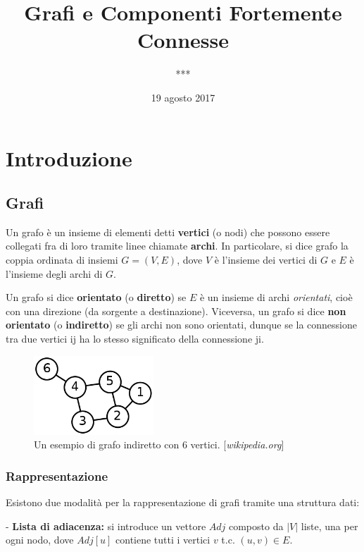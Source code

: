 \documentclass[a4paper,12pt]{article}
\title{Grafi e Componenti Fortemente Connesse}
\author{***}
\date{19 agosto 2017}
\begin{document}
\maketitle

\section{Introduzione}
\subsection{Grafi}
Un grafo è un insieme di elementi detti \textbf{vertici} (o nodi) che possono essere collegati fra di loro tramite linee chiamate \textbf{archi}. In particolare, si dice grafo la coppia ordinata di insiemi $G = (V, E)$, dove $V$ è l'insieme dei vertici di $G$ e $E$ è l'insieme degli archi di $G$.

Un grafo si dice \textbf{orientato} (o \textbf{diretto}) se $E$ è un insieme di archi \textit{orientati}, cioè con una direzione (da sorgente a destinazione). Viceversa, un grafo si dice \textbf{non orientato} (o \textbf{indiretto}) se gli archi non sono orientati, dunque se la connessione tra due vertici i\textrightarrow j ha lo stesso significato della connessione j\textrightarrow i.

\begin{figure}[h]
    \centering
    \captionsetup{justification=centering,margin=1cm}
    \includegraphics[width=0.4\textwidth]{graph}
    \caption{Un esempio di grafo indiretto con 6 vertici. [\textit{wikipedia.org}]}
    \label{fig:graph}
\end{figure}

\subsubsection{Rappresentazione}
Esistono due modalità per la rappresentazione di grafi tramite una struttura dati:
\newline

- \textbf{Lista di adiacenza:}
si introduce un vettore $Adj$ composto da $|V|$ liste, una per ogni nodo, dove $Adj[u]$ contiene tutti i vertici $v$ t.c. $(u, v) \in E$.
\end{document}
